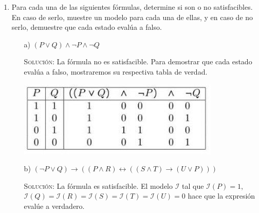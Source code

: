 \documentclass[letterpaper,11pt]{article}
\begin{document}
\begin{enumerate}
\begin{itemize}
        \item[c)] $(A \land B) → Q ≡ A → (B → Q)$
        \begin{proof}
            \begin{align*}
                (A \land B) → Q 
                ≡& \; \neg (A \land B) \lor Q
                && \text{equivalencia de $→$} \\ 
                ≡& \; (\neg A \lor \neg B) \lor Q
                && \text{De Morgan} \\ 
                ≡& \; \neg A \lor (\neg B \lor Q)
                && \text{asociatividad} \\ 
                ≡& \; A → (B → Q)
                && \text{equivalencia de $→$}
            \end{align*}
        \end{proof}
    \end{itemize}

    \item Para cada una de las siguientes fórmulas, determine si son o no 
    satisfacibles. En caso de serlo, muestre un modelo para cada una de ellas,
    y en caso de no serlo, demuestre que cada estado evalúa a falso.

    \begin{itemize}
        \item[a)] $(P \lor Q) \land \neg P \land \neg Q$ 

        \textsc{Solución:} La fórmula no es satisfacible. Para demostrar que 
        cada estado evalúa a falso, mostraremos su respectiva tabla de verdad.

        \begin{center}
            \centerline{\includegraphics[scale=0.7]{tabla.jpg}}
        \end{center}

        \item[b)] $(\neg P \lor Q) → ((P \land R) ↔ ((S \land T) → (U \lor P)))$

        \textsc{Solución:} La fórmula es satisfacible. El modelo $\mathcal{I}$
        tal que $\mathcal{I}(P) = 1$, $\mathcal{I}(Q) = \mathcal{I}(R) = 
        \mathcal{I}(S) = \mathcal{I}(T) = \mathcal{I}(U) = 0$ hace 
        que la expresión evalúe a verdadero.
    \end{itemize}


\end{enumerate}
\end{document}
